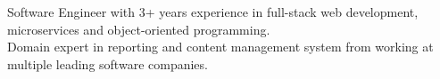 \begin{rSection}{}
    \begin{center}
        Software Engineer with 3+ years experience in full-stack web development, microservices and object-oriented programming. \\
        Domain expert in reporting and content management system from working at multiple leading software companies.
    \end{center}
\end{rSection}